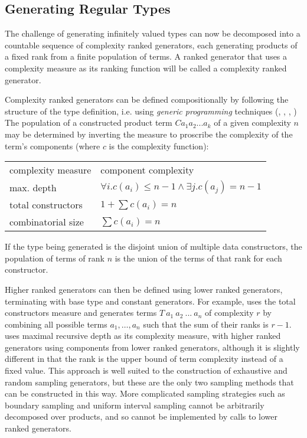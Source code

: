 \subsection{Generating Regular Types}\label{sub:gensubst}
The challenge of generating infinitely valued types can now be 
decomposed into a countable sequence of complexity ranked generators,
each generating products of a fixed rank from a finite population of terms.
A ranked generator that uses a complexity measure as its ranking function 
will be called a complexity ranked generator.

Complexity ranked generators can be defined compositionally
by following the structure of the type definition,
i.e. using \emph{generic programming} techniques
(\cite{Bird99}, \cite{Gib-dgp06}, \cite{LPJ03}, \cite{ComparingGP})
The population of a constructed product term $C a_1 a_2 ... a_k $ of a given complexity $n$
may be determined by inverting the measure to proscribe the complexity of the term's components
(where $c$ is the complexity function):

\begin{tabular}{l l}
complexity measure & component complexity\\
max. depth & $ \forall i . c (a_i) \le n - 1  \land \exists j . c (a_j) = n - 1$\\
total constructors &  $1 + \sum c (a_i) = n$ \\
combinatorial size &  $\sum c (a_i) = n$ 
\end{tabular}

\noindent
If the type being generated is the disjoint union of multiple data constructors,
the population of terms of rank $n$ is the union of the terms of that rank for each constructor.

Higher ranked generators can then be defined using lower ranked generators,
terminating with base type and constant generators.
For example, \SC uses the total constructors measure and
generates terms $T\ a_1\ a_2\ ...\ a_n$ of complexity $r$ by
combining all possible terms $a_1, \dots, a_n$ such that the sum of their ranks is $r-1$.
\QC uses maximal recursive depth as its complexity measure,
with higher ranked generators using components from lower ranked generators,
although it is slightly different in that the rank is the upper bound of term complexity instead of a fixed value.
This approach is well suited to the construction of exhaustive and random sampling generators,
but these are the only two sampling methods that can be constructed in this way.
More complicated sampling strategies such as boundary sampling and uniform interval sampling
cannot be arbitrarily decomposed over products,
and so cannot be implemented by calls to lower ranked generators.

